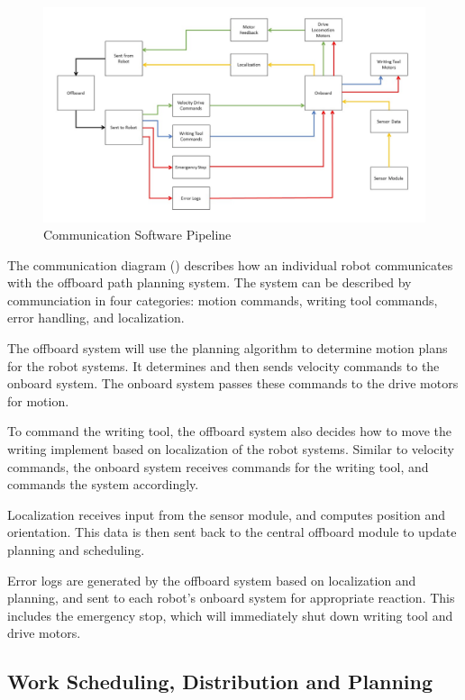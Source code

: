 \begin{figure}[h!]
 \centering
  \includegraphics[width=0.99\columnwidth]{diagrams/sw_arch_communication.jpg}
	\caption{Communication Software Pipeline}
 \label{fig:comm_processing}
\end{figure}

The communication diagram () describes how an individual robot communicates with the offboard path planning system. The system can be described by communciation in four categories: motion commands, writing tool commands, error handling, and localization.

The offboard system will use the planning algorithm to determine motion plans for the robot systems. It determines and then sends velocity commands to the onboard system. The onboard system passes these commands to the drive motors for motion.

To command the writing tool, the offboard system also decides how to move the writing implement based on localization of the robot systems. Similar to velocity commands, the onboard system receives commands for the writing tool, and commands the system accordingly.

Localization receives input from the sensor module, and computes position and orientation. This data is then sent back to the central offboard module to update planning and scheduling.

Error logs are generated by the offboard system based on localization and planning, and sent to each robot's onboard system for appropriate reaction. This includes the emergency stop, which will immediately shut down writing tool and drive motors.

\subsection{Work Scheduling, Distribution and Planning}
\label{sec:sw_arch_planner}

